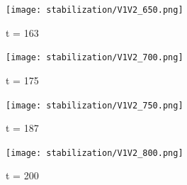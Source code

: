 \documentclass[a4paper,11pt]{article}
\begin{document}
\begin{figure}[H]
\centering
\texttt{[image: stabilization/V1V2\_650.png]}
\caption{t = 163}
\end{figure}
\begin{figure}[H]
\centering
\texttt{[image: stabilization/V1V2\_700.png]}
\caption{t = 175}
\end{figure}
\begin{figure}[H]
\centering
\texttt{[image: stabilization/V1V2\_750.png]}
\caption{t = 187}
\end{figure}
\begin{figure}[H]
\centering
\texttt{[image: stabilization/V1V2\_800.png]}
\caption{t = 200}
\end{figure}















\newpage
\end{document}
